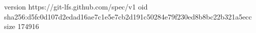 version https://git-lfs.github.com/spec/v1
oid sha256:d5fc0d107d2edad16ae7c1e5e7cb2d191c50284e79f230ed8b8bc22b321a5ecc
size 174916

